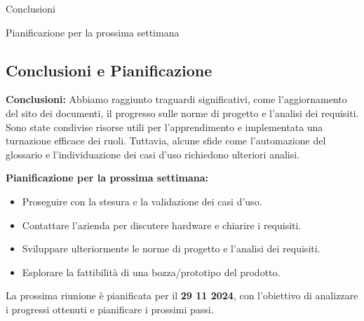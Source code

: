 \documentclass{article}
\newcommand{\isEsterno}{0}
\begin{document}



Conclusioni


Pianificazione per la prossima settimana











    \subsection*{Conclusioni e Pianificazione} 
    \textbf{Conclusioni:} Abbiamo raggiunto traguardi significativi, come l’aggiornamento del sito dei documenti, il progresso sulle norme di progetto e l’analisi dei requisiti. Sono state condivise risorse utili per l’apprendimento e implementata una turnazione efficace dei ruoli. Tuttavia, alcune sfide come l’automazione del glossario e l’individuazione dei casi d’uso richiedono ulteriori analisi.

    \textbf{Pianificazione per la prossima settimana:} 
    \begin{itemize}
        \item Proseguire con la stesura e la validazione dei casi d’uso.
        \item Contattare l’azienda per discutere hardware e chiarire i requisiti.
        \item Sviluppare ulteriormente le norme di progetto e l’analisi dei requisiti.
        \item Esplorare la fattibilità di una bozza/prototipo del prodotto.
    \end{itemize}

    La prossima riunione è pianificata per il \textbf{29 11 2024}, con l'obiettivo di analizzare i progressi ottenuti e pianificare i prossimi passi.




\ifthenelse{\equal{\isEsterno}{1}}{
    \begin{table}[b]
        \begin{tabular}{@{}p{.5in}p{4in}@{}}
            Data:  & \hrulefill \\
                   &     		\\
                   &     		\\
            Firma: & \hrulefill \\
        \end{tabular}
        \end{table}
}{}
\end{document}
